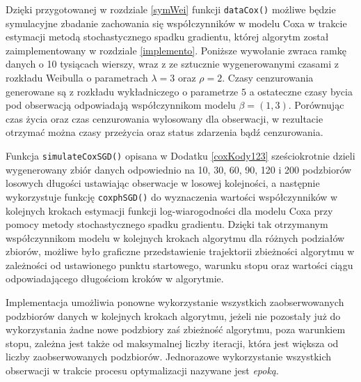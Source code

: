 Dzięki przygotowanej w rozdziale \ref{symWei} funkcji \texttt{dataCox()} możliwe będzie symulacyjne zbadanie zachowania się współczynników w modelu Coxa w trakcie estymacji metodą stochastycznego spadku gradientu, której algorytm został zaimplementowany w rozdziale \ref{implemento}. Poniższe wywołanie zwraca ramkę danych o 10 tysiącach wierszy, wraz z ze sztucznie wygenerowanymi czasami z rozkładu Weibulla o parametrach $\lambda =3$ oraz $\rho =2$. Czasy cenzurowania generowane są z rozkładu wykładniczego o parametrze $5$ a ostateczne czasy bycia pod obserwacją odpowiadają współczynnikom modelu $\beta = (1,3)$. Porównując czas życia oraz czas cenzurowania wylosowany dla obserwacji, w rezultacie otrzymać można czasy przeżycia oraz status zdarzenia bądź cenzurowania. 
\begin{Shaded}
\begin{Highlighting}[]
\StringTok{ }\NormalTok{(}\NormalTok{(}\NormalTok{:}\NormalTok{, } \NormalTok{, } \NormalTok{), } \NormalTok{)}
\StringTok{ }\NormalTok{(}\NormalTok{^}\NormalTok{, } \NormalTok{, }  \NormalTok{(}\NormalTok{,}\NormalTok{), } \NormalTok{) }
\end{Highlighting}
\end{Shaded}
Funkcja \texttt{simulateCoxSGD()} opisana w Dodatku \ref{coxKody123} sześciokrotnie dzieli wygenerowany zbiór danych odpowiednio na 10, 30, 60, 90, 120 i 200 podzbiorów losowych długości ustawiając obserwacje w losowej kolejności, a następnie wykorzystuje funkcję \texttt{coxphSGD()} do wyznaczenia wartości współczynników w kolejnych krokach estymacji funkcji log-wiarogodności dla modelu Coxa przy pomocy metody stochastycznego spadku gradientu. Dzięki tak otrzymanym współczynnikom modelu w kolejnych krokach algorytmu dla różnych podziałów zbiorów, możliwe było graficzne przedstawienie trajektorii zbieżności algorytmu w zależności od ustawionego punktu startowego, warunku stopu oraz wartości ciągu odpowiadającego długościom kroków w algorytmie. 

Implementacja umożliwia ponowne wykorzystanie wszystkich zaobserwowanych podzbiorów danych w kolejnych krokach algorytmu, jeżeli nie pozostały już do wykorzystania żadne nowe podzbiory zaś zbieżność algorytmu, poza warunkiem stopu, zależna jest także od maksymalnej liczby iteracji, która jest większa od liczby zaobserwowanych podzbiorów. Jednorazowe wykorzystanie wszystkich obserwacji w trakcie procesu optymalizacji nazywane jest \textit{epoką}. 

